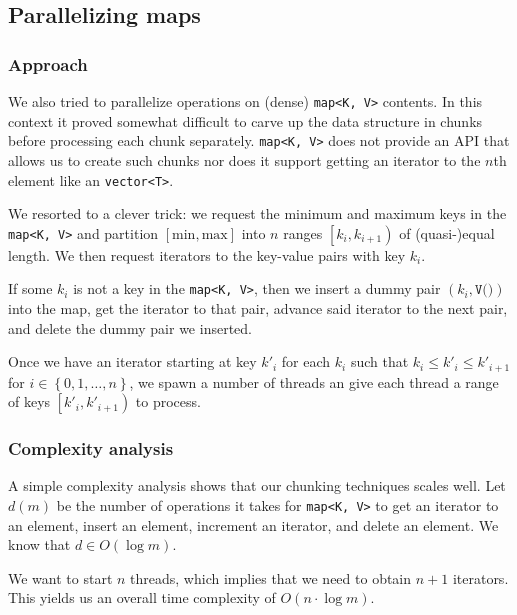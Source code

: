 \documentclass[a4paper,12pt]{article}
\newcommand{\shorttypename}[1]{\texttt{#1}}
\newcommand{\typename}[2]{\texttt{#2}} %
\begin{document}
\subsection{Parallelizing maps}

\subsubsection{Approach}

We also tried to parallelize operations on (dense) \typename{std}{map<K, V>} contents. In this context it proved somewhat difficult to carve up the data structure in chunks before processing each chunk separately. \typename{std}{map<K, V>} does not provide an API that allows us to create such chunks nor does it support getting an iterator to the $n$th element like an \typename{std}{vector<T>}.

We resorted to a clever trick: we request the minimum and maximum keys in the \typename{std}{map<K, V>} and partition $\left[\text{min}, \text{max}\right]$ into $n$ ranges $\left[k_i, k_{i+1}\right)$ of (quasi-)equal length. We then request iterators to the key-value pairs with key $k_i$.

If some $k_i$ is not a key in the \typename{std}{map<K, V>}, then we insert a dummy pair $\left(k_i, \shorttypename{V()}\right)$ into the map, get the iterator to that pair, advance said iterator to the next pair, and delete the dummy pair we inserted.

Once we have an iterator starting at key $k'_i$ for each $k_i$ such that $k_i \le k'_i \le k'_{i+1}$ for $i \in \left\{0, 1, \dots, n\right\}$, we spawn a number of threads an give each thread a range of keys $\left[k'_i, k'_{i+1}\right)$ to process.

\subsubsection{Complexity analysis}

A simple complexity analysis shows that our chunking techniques scales well. Let $d\left(m\right)$ be the number of operations it takes for \typename{std}{map<K, V>} to get an iterator to an element, insert an element, increment an iterator, and delete an element. We know that $d \in O\left(\log m\right)$.

We want to start $n$ threads, which implies that we need to obtain $n + 1$ iterators. This yields us an overall time complexity of $O\left(n \cdot \log m\right)$.
\end{document}
